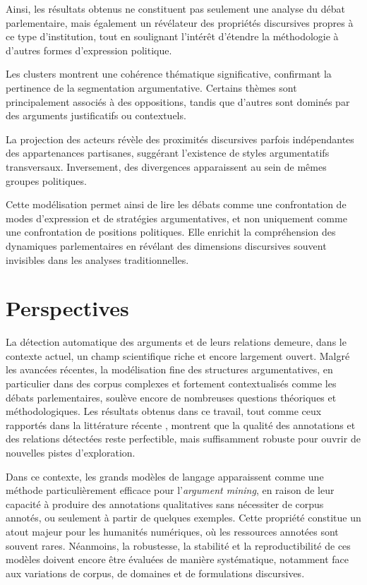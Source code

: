 \documentclass[final, fra]{anthology-ch}      %
\begin{document}
Ainsi, les résultats obtenus ne constituent pas seulement une analyse du débat parlementaire, mais également un révélateur des propriétés discursives propres à ce type d’institution, tout en soulignant l’intérêt d’étendre la méthodologie à d’autres formes d’expression politique.

Les clusters montrent une cohérence thématique significative, confirmant la pertinence de la segmentation argumentative. Certains thèmes sont principalement associés à des oppositions, tandis que d’autres sont dominés par des arguments justificatifs ou contextuels.

La projection des acteurs révèle des proximités discursives parfois indépendantes des appartenances partisanes, suggérant l’existence de styles argumentatifs transversaux. Inversement, des divergences apparaissent au sein de mêmes groupes politiques.

Cette modélisation permet ainsi de lire les débats comme une confrontation de modes d’expression et de stratégies argumentatives, et non uniquement comme une confrontation de positions politiques. Elle enrichit la compréhension des dynamiques parlementaires en révélant des dimensions discursives souvent invisibles dans les analyses traditionnelles.

\section{Perspectives}


La détection automatique des arguments et de leurs relations demeure, dans le contexte actuel, un champ scientifique riche et encore largement ouvert. Malgré les avancées récentes, la modélisation fine des structures argumentatives, en particulier dans des corpus complexes et fortement contextualisés comme les débats parlementaires, soulève encore de nombreuses questions théoriques et méthodologiques. Les résultats obtenus dans ce travail, tout comme ceux rapportés dans la littérature récente \cite{gorur2025, cabessa2025}, montrent que la qualité des annotations et des relations détectées reste perfectible, mais suffisamment robuste pour ouvrir de nouvelles pistes d’exploration.

Dans ce contexte, les grands modèles de langage apparaissent comme une méthode particulièrement efficace pour l’\textit{argument mining}, en raison de leur capacité à produire des annotations qualitatives sans nécessiter de corpus annotés, ou seulement à partir de quelques exemples. Cette propriété constitue un atout majeur pour les humanités numériques, où les ressources annotées sont souvent rares. Néanmoins, la robustesse, la stabilité et la reproductibilité de ces modèles doivent encore être évaluées de manière systématique, notamment face aux variations de corpus, de domaines et de formulations discursives.
\end{document}
